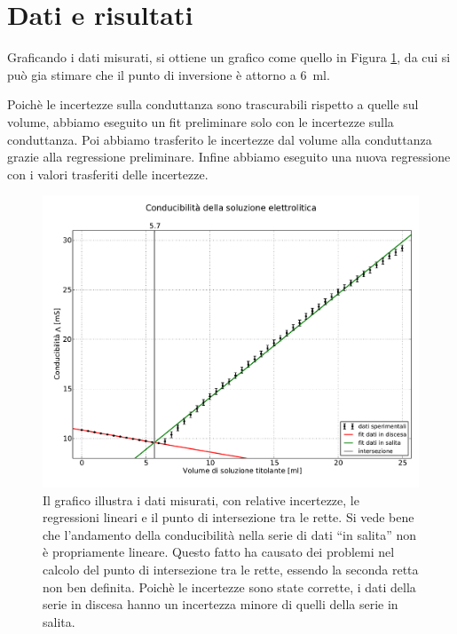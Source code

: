 \section*{Dati e risultati}

Graficando i dati misurati, si ottiene un grafico come quello in Figura \ref{fig:meas}, da cui si può gia stimare
che il punto di inversione è attorno a \SI{6}{\milli\litre}.

Poichè le incertezze sulla conduttanza sono trascurabili rispetto a quelle sul volume, abbiamo eseguito un fit preliminare
solo con le incertezze sulla conduttanza. Poi abbiamo trasferito le incertezze dal volume alla conduttanza grazie alla regressione preliminare.
Infine abbiamo eseguito una nuova regressione con i valori trasferiti delle incertezze. 

\begin{figure}
    \includegraphics[scale=0.5]{Rette_von_Fitt.pdf}
    \caption{Il grafico illustra i dati  misurati, con relative incertezze, le regressioni lineari
        e il punto di intersezione tra le rette. Si vede bene che l'andamento della conducibilità
        nella serie di dati ``in salita'' non è propriamente lineare.
        Questo fatto ha causato dei problemi nel calcolo del punto di intersezione tra le rette,
        essendo la seconda retta non ben definita.
        Poichè le incertezze sono state corrette, i dati della serie
        in discesa hanno un incertezza minore di quelli della serie in salita.}
    \label{fig:meas}
\end{figure}

